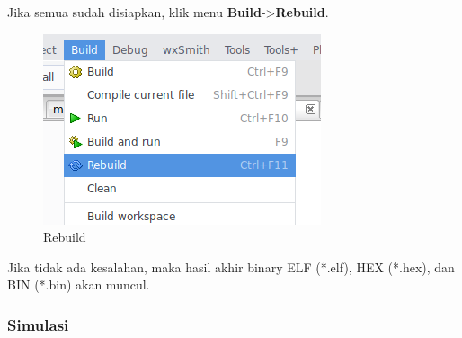 \documentclass[12pt,]{article}
\begin{document}
	\newpage
	Jika semua sudah disiapkan, klik menu \textbf{Build}->\textbf{Rebuild}.
	\begin{figure}[H]
		\centering
		\includegraphics[width=0.5\linewidth]{images/hello_a15}
		\caption{Rebuild}
	\end{figure}

	Jika tidak ada kesalahan, maka hasil akhir binary ELF (*.elf), HEX (*.hex), dan BIN (*.bin) akan muncul.

	\newpage
	\subsubsection{Simulasi}
\end{document}
